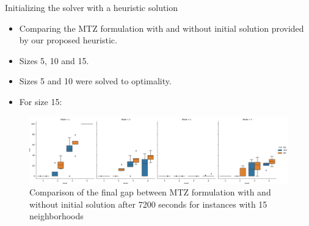 \documentclass[slidestop,usepdftitle=false,10pt]{beamer}
\begin{document}
	\begin{frame}{Initializing the solver with a heuristic solution}
	    \begin{itemize}
	        \item Comparing the MTZ formulation with and without initial solution provided by our proposed heuristic.
	        \item Sizes 5, 10 and 15.
	        \item Sizes 5 and 10 were solved to optimality.
	        \item For size 15:
	    \end{itemize}
	    \begin{figure}[h!]
         \centering
         \includegraphics[width=1\linewidth]{final_gap_MTZs.png}
         \caption{Comparison of the final gap between MTZ formulation with and without initial solution after 7200 seconds for instances with 15 neighborhoods}
         \label{fig:final_gap}
        \end{figure}
	\end{frame}
	
\end{document}
